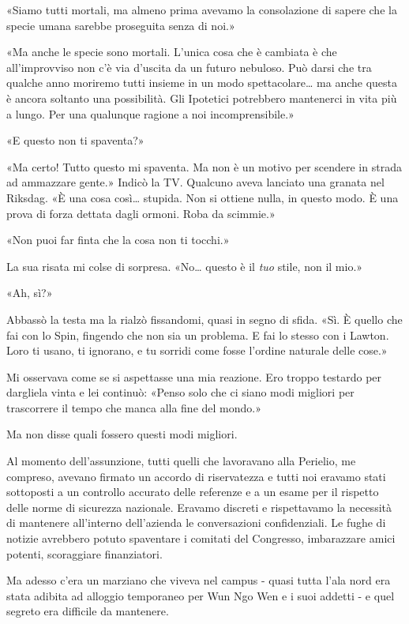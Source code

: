 «Siamo tutti mortali, ma almeno prima avevamo la consolazione di sapere
che la specie umana sarebbe proseguita senza di noi.»

«Ma anche le specie sono mortali. L'unica cosa che è cambiata è che
all'improvviso non c'è via d'uscita da un futuro nebuloso. Può darsi che
tra qualche anno moriremo tutti insieme in un modo spettacolare\ldots{}
ma anche questa è ancora soltanto una possibilità. Gli Ipotetici
potrebbero mantenerci in vita più a lungo. Per una qualunque ragione a
noi incomprensibile.»

«E questo non ti spaventa?»

«Ma certo! Tutto questo mi spaventa. Ma non è un motivo per scendere in
strada ad ammazzare gente.» Indicò la TV. Qualcuno aveva lanciato una
granata nel Riksdag. «È una cosa così\ldots{} stupida. Non si ottiene
nulla, in questo modo. È una prova di forza dettata dagli ormoni. Roba
da scimmie.»

«Non puoi far finta che la cosa non ti tocchi.»

La sua risata mi colse di sorpresa. «No\ldots{} questo è il \emph{tuo}
stile, non il mio.»

«Ah, sì?»

Abbassò la testa ma la rialzò fissandomi, quasi in segno di sfida. «Sì.
È quello che fai con lo Spin, fingendo che non sia un problema. E fai lo
stesso con i Lawton. Loro ti usano, ti ignorano, e tu sorridi come fosse
l'ordine naturale delle cose.»

Mi osservava come se si aspettasse una mia reazione. Ero troppo testardo
per dargliela vinta e lei continuò: «Penso solo che ci siano modi
migliori per trascorrere il tempo che manca alla fine del mondo.»

Ma non disse quali fossero questi modi migliori.

\separatorefiori

Al momento dell'assunzione, tutti quelli che lavoravano alla Perielio,
me compreso, avevano firmato un accordo di riservatezza e tutti noi
eravamo stati sottoposti a un controllo accurato delle referenze e a un
esame per il rispetto delle norme di sicurezza nazionale. Eravamo
discreti e rispettavamo la necessità di mantenere all'interno
dell'azienda le conversazioni confidenziali. Le fughe di notizie
avrebbero potuto spaventare i comitati del Congresso, imbarazzare amici
potenti, scoraggiare finanziatori.

Ma adesso c'era un marziano che viveva nel campus - quasi tutta l'ala
nord era stata adibita ad alloggio temporaneo per Wun Ngo Wen e i suoi
addetti - e quel segreto era difficile da mantenere.

